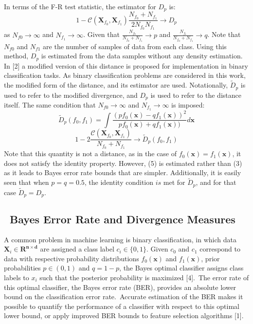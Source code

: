 \documentclass{article}
\begin{document}
	\indent In terms of the F-R test statistic, the estimator for $D_p$ is:
	\begin{equation}
	1 - \mathcal{C}(\textbf{X}_{f_0},\textbf{X}_{f_1})\frac{N_{f_0}+N_{f_1}}{2N_{f_0} N_{f_1}} \rightarrow D_p
	\end{equation}
	as $N_{f0} \rightarrow \infty$ and $N_{f_1} \rightarrow \infty$. Given that $\frac{N_{f_0}}{N_{f_0}+N_{f_1}} \rightarrow p$ and $\frac{N_{f_1}}{N_{f_0}+N_{f_1}} \rightarrow q$. Note that $N_{f0}$ and $N_{f1}$ are the number of samples of data from each class. Using this method, $D_p$ is estimated from the data samples without any density estimation. 
	\\	[0.5 ex]

	\indent In [2] a modified version of this distance is proposed for implementation in binary classification tasks. As binary classification problems are considered in this work, the modified form of the distance, and its estimator are used. Notationally, $\widetilde{D}_p$ is used to refer to the modified divergence, and $D_p$ is used to refer to the distance itself. The same condition that $N_{f0} \rightarrow \infty$ and $N_{f_1} \rightarrow \infty$ is imposed:
	\begin{equation}
		\widetilde{D}_p(f_0,f_1)=\int \frac{(p{f_0}(\textbf{x})-q{f_1}(\textbf{x}))^2}{p{f_0}(\textbf{x})+q{f_1}(\textbf{x}))}d\textbf{x}
	\end{equation}
	\begin{equation}
	1 - 2 \frac{\mathcal{C}(\textbf{X}_{f_0},\textbf{X}_{f_1})}{N_{f_0} + N_{f_1}} \rightarrow \widetilde{D}_p(f_0,f_1)
	\end{equation}
	Note that this quantity is not a distance, as in the case of $f_0(\textbf{x})=f_1(\textbf{x})$, it does not satisfy the identity property. However, (5) is estimated rather than (3) as it leads to Bayes error rate bounds that are simpler. Additionally, it is easily seen that when $p=q=0.5$, the identity condition $is$ met for $\widetilde{D}_p$, and for that case $\widetilde{D}_p=D_p$.
	
	\subsection{\ Bayes Error Rate and Divergence Measures}
	\indent A common problem in machine learning is binary classification, in which data $\textbf{X}_i\in \mathbf{R^{n \times d}}$ are assigned a class label $c_i \in \{0,1\}$.
	Given $c_0$ and $c_1$ correspond to data with respective probability distributions $f_0(\textbf{x})$ and $f_1(\textbf{x})$, prior probabilities $p \in (0,1)$ and $q=1-p$, the Bayes optimal classifier assigns class labels to $x_i$ such that the posterior probability is maximized [4].\ The error rate of this optimal classifier, the Bayes error rate (BER), provides an absolute lower bound on the classification error rate.\ Accurate estimation of the BER makes it possible to quantify the performance of a classifier with respect to this optimal lower bound, or apply improved BER bounds to feature selection algorithms [1]. 
	\\ [0.5ex]
	
\end{document}

